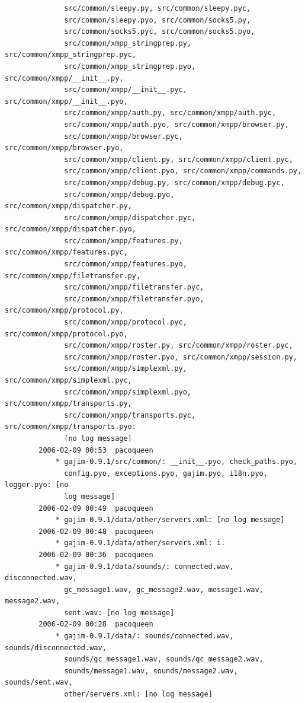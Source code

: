 \documentclass[a4paper]{article}
\begin{document}
\begin{verbatim}
              src/common/sleepy.py, src/common/sleepy.pyc,
              src/common/sleepy.pyo, src/common/socks5.py,
              src/common/socks5.pyc, src/common/socks5.pyo,
              src/common/xmpp_stringprep.py, src/common/xmpp_stringprep.pyc,
              src/common/xmpp_stringprep.pyo, src/common/xmpp/__init__.py,
              src/common/xmpp/__init__.pyc, src/common/xmpp/__init__.pyo,
              src/common/xmpp/auth.py, src/common/xmpp/auth.pyc,
              src/common/xmpp/auth.pyo, src/common/xmpp/browser.py,
              src/common/xmpp/browser.pyc, src/common/xmpp/browser.pyo,
              src/common/xmpp/client.py, src/common/xmpp/client.pyc,
              src/common/xmpp/client.pyo, src/common/xmpp/commands.py,
              src/common/xmpp/debug.py, src/common/xmpp/debug.pyc,
              src/common/xmpp/debug.pyo, src/common/xmpp/dispatcher.py,
              src/common/xmpp/dispatcher.pyc, src/common/xmpp/dispatcher.pyo,
              src/common/xmpp/features.py, src/common/xmpp/features.pyc,
              src/common/xmpp/features.pyo, src/common/xmpp/filetransfer.py,
              src/common/xmpp/filetransfer.pyc,
              src/common/xmpp/filetransfer.pyo, src/common/xmpp/protocol.py,
              src/common/xmpp/protocol.pyc, src/common/xmpp/protocol.pyo,
              src/common/xmpp/roster.py, src/common/xmpp/roster.pyc,
              src/common/xmpp/roster.pyo, src/common/xmpp/session.py,
              src/common/xmpp/simplexml.py, src/common/xmpp/simplexml.pyc,
              src/common/xmpp/simplexml.pyo, src/common/xmpp/transports.py,
              src/common/xmpp/transports.pyc, src/common/xmpp/transports.pyo:
              [no log message]
        2006-02-09 00:53  pacoqueen
            * gajim-0.9.1/src/common/: __init__.pyo, check_paths.pyo,
              config.pyo, exceptions.pyo, gajim.pyo, i18n.pyo, logger.pyo: [no
              log message]
        2006-02-09 00:49  pacoqueen
            * gajim-0.9.1/data/other/servers.xml: [no log message]
        2006-02-09 00:48  pacoqueen
            * gajim-0.9.1/data/other/servers.xml: i.
        2006-02-09 00:36  pacoqueen
            * gajim-0.9.1/data/sounds/: connected.wav, disconnected.wav,
              gc_message1.wav, gc_message2.wav, message1.wav, message2.wav,
              sent.wav: [no log message]
        2006-02-09 00:28  pacoqueen
            * gajim-0.9.1/data/: sounds/connected.wav, sounds/disconnected.wav,
              sounds/gc_message1.wav, sounds/gc_message2.wav,
              sounds/message1.wav, sounds/message2.wav, sounds/sent.wav,
              other/servers.xml: [no log message]

\end{verbatim}
\end{document}
